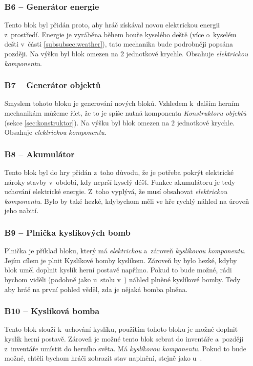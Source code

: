 \subsubsection{B6 -- Generátor energie}
\label{blocks:B6}
Tento blok byl přidán proto, aby hráč získával novou elektrickou energii z~prostředí. Energie je vyráběna během bouře kyselého deště (více o~kyselém dešti v~části \ref{subsubsec:weather}), tato mechanika bude podrobněji popsána později. Na výšku byl blok omezen na 2 jednotkové krychle. Obsahuje \textit{elektrickou komponentu}. 


\subsubsection{B7 -- Generátor objektů}
\label{blocks:B7}
Smyslem tohoto bloku je generování nových bloků. Vzhledem k~dalším herním mechanikám můžeme říct, že to je spíše nutná komponenta \textit{Konstruktoru objektů} (sekce \ref{sec:konstruktor}). Na výšku byl blok omezen na 2 jednotkové krychle. Obsahuje \textit{elektrickou komponentu}.


\subsubsection{B8 -- Akumulátor}
\label{blocks:B8}
Tento blok byl do hry přidán z~toho důvodu, že je potřeba pokrýt elektrické nároky stavby v~období, kdy neprší kyselý déšť. Funkce akumulátoru je tedy uchování elektrické energie. Z~toho vyplývá, že musí obsahovat \textit{elektrickou komponentu}. Bylo by také hezké, kdybychom měli ve hře rychlý náhled na úroveň jeho nabití.


\subsubsection{B9 -- Plnička kyslíkových bomb}
\label{blocks:B9}
Plnička je příklad bloku, který má \textit{elektrickou} a~zároveň \textit{kyslíkovou komponentu}. Jejím cílem je plnit Kyslíkové bomby kyslíkem. Zároveň by bylo hezké, kdyby blok uměl doplnit kyslík herní postavě napřímo. Pokud to bude možné, rádi bychom viděli (podobně jako u~stolu v~\ME{}) náhled plněné kyslíkové bomby. Tedy aby hráč na první pohled věděl, zda je nějaká bomba plněna.

\subsubsection{B10 -- Kyslíková bomba}
\label{blocks:B10}
Tento blok slouží k~uchování kyslíku, použitím tohoto bloku je možné doplnit kyslík herní postavě. Zároveň je možné tento blok sebrat do inventáře a~později z~inventáře umístit do herního světa. Má \textit{kyslíkovou komponentu}. Pokud to bude možné, chtěli bychom hráči zobrazit stav naplnění, stejně jako u~.


